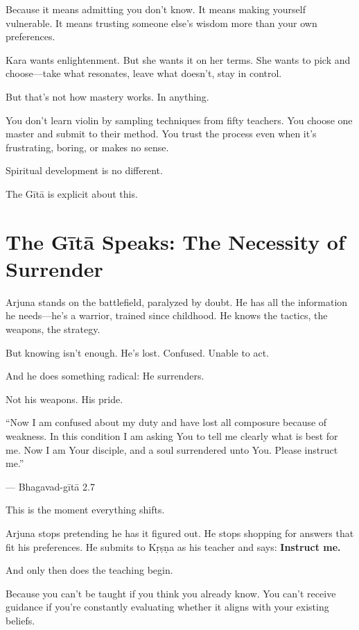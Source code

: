 \documentclass[11pt,twoside]{book}
\begin{document}
Because it means admitting you don't know. It means making yourself vulnerable. It means trusting someone else's wisdom more than your own preferences.

Kara wants enlightenment. But she wants it on her terms. She wants to pick and choose—take what resonates, leave what doesn't, stay in control.

But that's not how mastery works. In anything.

You don't learn violin by sampling techniques from fifty teachers. You choose one master and submit to their method. You trust the process even when it's frustrating, boring, or makes no sense.

Spiritual development is no different.

The Gītā is explicit about this.

\section*{The Gītā Speaks: The Necessity of Surrender}

Arjuna stands on the battlefield, paralyzed by doubt. He has all the information he needs—he's a warrior, trained since childhood. He knows the tactics, the weapons, the strategy.

But knowing isn't enough. He's lost. Confused. Unable to act.

And he does something radical: He surrenders.

Not his weapons. His pride.

\begin{pullquote}
``Now I am confused about my duty and have lost all composure because of weakness. In this condition I am asking You to tell me clearly what is best for me. Now I am Your disciple, and a soul surrendered unto You. Please instruct me.''

--- Bhagavad-gītā 2.7
\end{pullquote}

This is the moment everything shifts.

Arjuna stops pretending he has it figured out. He stops shopping for answers that fit his preferences. He submits to Kṛṣṇa as his teacher and says: \textbf{Instruct me.}

And only then does the teaching begin.

Because you can't be taught if you think you already know. You can't receive guidance if you're constantly evaluating whether it aligns with your existing beliefs.
\end{document}
